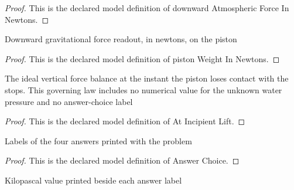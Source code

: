 \begin{proof}
  This is the declared model definition of downward Atmospheric Force In Newtons.
\end{proof}
\begin{definition}
  \label{def:physics:phyx-mini-0384:phyxminiproblems-problemphyxmini0384-pistonweightinnewtons}
  Downward gravitational force readout, in newtons, on the piston
\end{definition}
\begin{proof}
  This is the declared model definition of piston Weight In Newtons.
\end{proof}
\begin{definition}
  \label{def:physics:phyx-mini-0384:phyxminiproblems-problemphyxmini0384-atincipientlift}
  The ideal vertical force balance at the instant the piston loses contact with the stops. This governing law includes no numerical value for the unknown water pressure and no answer-choice label
\end{definition}
\begin{proof}
  This is the declared model definition of At Incipient Lift.
\end{proof}
\begin{definition}
  \label{def:physics:phyx-mini-0384:phyxminiproblems-problemphyxmini0384-answerchoice}
  Labels of the four answers printed with the problem
\end{definition}
\begin{proof}
  This is the declared model definition of Answer Choice.
\end{proof}
\begin{definition}
  \label{def:physics:phyx-mini-0384:phyxminiproblems-problemphyxmini0384-answerpressureinkilopascals}
  Kilopascal value printed beside each answer label
\end{definition}
